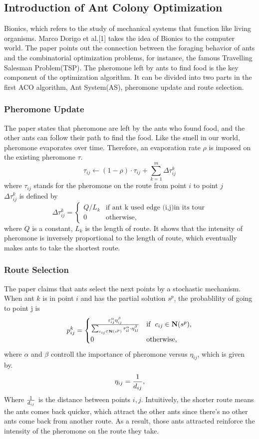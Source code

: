 \documentclass[12pt,journal,compsoc]{IEEEtran}
\begin{document}
\subsection{Introduction of Ant Colony Optimization}

Bionics, which refers to the study of mechanical systems that function like living organisms. Marco Dorigo et al.[1] takes the idea of Bionics to the computer world. The paper points out the connection between the foraging behavior of ants and the combinatorial optimization problems, for instance, the famous Travelling Salesman Problem(TSP). The pheromone left by ants to find food is the key component of the optimization algorithm. It can be divided into two parts in the first ACO algorithm, Ant System(AS), pheromone update and route selection.


\subsubsection{Pheromone Update}
The paper states that pheromone are left by the ants who found food, and the other ants can follow their path to find the food. Like the smell in our world, pheromone evaporates over time. Therefore, an evaporation rate $\rho$ is imposed on the existing pheromone $\tau$.
\[\tau_{ij}\leftarrow(1-\rho)\cdot\tau_{ij}+\sum\limits_{k=1}^{m}\Delta\tau_{ij}^{k}\]
where $\tau_{ij}$ stands for the pheromone on the route from point $i$ to point $j$ \\
$\Delta\tau_{ij}^{k}$ is defined by
\[\Delta\tau_{ij}^{k}=\begin{cases} Q/L_{k} &\mbox{if ant k used edge (i,j)in its tour} \\
0 & \mbox{otherwise,}\end{cases}\]
where $Q$ is a constant, $L_{k}$ is the length of route. It shows that the intensity of pheromone is inversely proportional to the length of route, which eventually makes ants to take the shortest route.
\subsubsection{Route Selection}
The paper claims that ants select the next points by a stochastic mechanism.
When ant $k$ is in point $i$ and has the partial solution $s^{p}$, the probablility of going to point j is
\[p_{ij}^{k}=\begin{cases} {\tau_{ij}^{\alpha}\eta_{ij}^{\beta}\over \sum\nolimits_{c_{ij}\in {\bf N}(s^{p})}\tau_{il}^{\alpha}\cdot\eta_{1l}^{\beta}} &\mbox{if }\ c_{ij}\in {\bf N}(s^{p}), \\
0 & \mbox{otherwise,}\end{cases}\]
where $\alpha$ and $\beta$ controll the importance of pheromone versus $\eta_{ij}$, which is given by.
\[\eta_{ij}={1\over d_{ij}},\]
Where $1\over d_{ij}$ is the distance between points $i, j$.
Intuitively, the shorter route means the ants comes back quicker, which attract the other ants since there's no other ants come back from another route. As a result, those ants attracted reinforce the intensity of the pheromone on the route they take.
\end{document}
